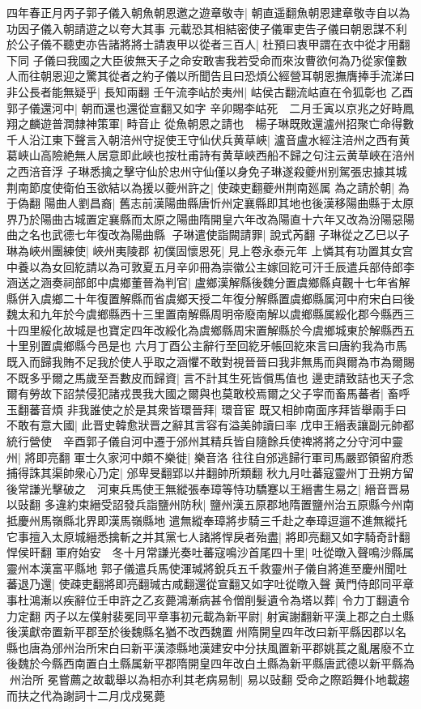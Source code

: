 四年春正月丙子郭子儀入朝魚朝恩邀之遊章敬寺|{
	朝直遥翻魚朝恩建章敬寺自以為功因子儀入朝請遊之以夸大其事}
元載恐其相結密使子儀軍吏告子儀曰朝恩謀不利於公子儀不聽吏亦告諸將將士請衷甲以從者三百人|{
	杜預曰衷甲謂在衣中從才用翻下同}
子儀曰我國之大臣彼無天子之命安敢害我若受命而來汝曹欲何為乃從家僮數人而往朝恩迎之驚其從者之約子儀以所聞告且曰恐煩公經營耳朝恩撫膺捧手流涕曰非公長者能無疑乎|{
	長知兩翻}
壬午流李岾於夷州|{
	岵侯古翻流岵直在令狐彰也}
乙酉郭子儀還河中|{
	朝而還也還從宣翻又如字}
辛卯賜李岵死　二月壬寅以京兆之好畤鳳翔之麟遊普潤隸神策軍|{
	畤音止}
從魚朝恩之請也　楊子琳既敗還瀘州招聚亡命得數千人沿江東下聲言入朝涪州守捉使王守仙伏兵黄草峽|{
	瀘音盧水經注涪州之西有黄葛峽山高險絶無人居意即此峽也按杜甫詩有黄草峽西船不歸之句注云黄草峽在涪州之西涪音浮}
子琳悉擒之擊守仙於忠州守仙僅以身免子琳遂殺夔州别駕張忠據其城荆南節度使衛伯玉欲結以為援以夔州許之|{
	使疎吏翻夔州荆南廵属}
為之請於朝|{
	為于偽翻}
陽曲人劉昌裔|{
	舊志前漢陽曲縣唐忻州定襄縣即其地也後漢移陽曲縣于太原界乃於陽曲古城置定襄縣而太原之陽曲隋開皇六年改為陽直十六年又改為汾陽惡陽曲之名也武德七年復改為陽曲縣}
子琳遣使詣闕請罪|{
	說式芮翻}
子琳從之乙巳以子琳為峽州團練使|{
	峽州夷陵郡}
初僕固懷恩死|{
	見上卷永泰元年}
上憐其有功置其女宫中養以為女回紇請以為可敦夏五月辛卯冊為崇徽公主嫁回紇可汗壬辰遣兵部侍郎李涵送之涵奏祠部郎中虞鄉董晉為判官|{
	盧鄉漢解縣後魏分置虞鄉縣貞觀十七年省解縣併入虞鄉二十年復置解縣而省虞鄉天授二年復分解縣置虞鄉縣属河中府宋白曰後魏太和九年於今虞鄉縣西十三里置南解縣周明帝廢南解以虞鄉縣属綏化郡今縣西三十四里綏化故城是也寶定四年改綏化為虞鄉縣周宋置解縣於今虞鄉城東於解縣西五十里别置虞鄉縣今邑是也}
六月丁酉公主辭行至回紇牙帳回紇來言曰唐約我為市馬既入而歸我賄不足我於使人乎取之涵懼不敢對視晉晉曰我非無馬而與爾為市為爾賜不既多乎爾之馬歲至吾數皮而歸資|{
	言不計其生死皆償馬值也}
邊吏請致詰也天子念爾有勞故下詔禁侵犯諸戎畏我大國之爾與也莫敢校焉爾之父子寜而畜馬蕃者|{
	畜呼玉翻蕃音煩}
非我誰使之於是其衆皆環晉拜|{
	環音宦}
既又相帥南面序拜皆舉兩手曰不敢有意大國|{
	此晋史韓愈狀晋之辭其言容有溢美帥讀曰率}
戊申王縉表讓副元帥都統行營使　辛酉郭子儀自河中遷于邠州其精兵皆自隨餘兵使禆將將之分守河中靈州|{
	將即亮翻}
軍士久家河中頗不樂徙|{
	樂音洛}
往往自邠逃歸行軍司馬嚴郢領留府悉捕得誅其渠帥衆心乃定|{
	邠卑旻翻郢以井翻帥所類翻}
秋九月吐蕃寇靈州丁丑朔方留後常謙光擊破之　河東兵馬使王無縱張奉璋等恃功驕蹇以王縉書生易之|{
	縉音晋易以䜴翻}
多違約束縉受詔發兵詣鹽州防秋|{
	鹽州漢五原郡地隋置鹽州治五原縣今州南抵慶州馬嶺縣北界即漢馬嶺縣地}
遣無縱奉璋將步騎三千赴之奉璋逗遛不進無縱托它事擅入太原城縉悉擒斬之并其黨七人諸將悍戾者殆盡|{
	將即亮翻又如字騎奇計翻悍侯旰翻}
軍府始安　冬十月常謙光奏吐蕃寇鳴沙首尾四十里|{
	吐從暾入聲鳴沙縣属靈州本漢富平縣地}
郭子儀遣兵馬使渾瑊將銳兵五千救靈州子儀自將進至慶州聞吐蕃退乃還|{
	使疎吏翻將即亮翻瑊古咸翻還從宣翻又如字吐從暾入聲}
黄門侍郎同平章事杜鴻漸以疾辭位壬申許之乙亥薨鴻漸病甚令僧削髮遺令為塔以葬|{
	令力丁翻遺令力定翻}
丙子以左僕射裴冕同平章事初元載為新平尉|{
	射寅謝翻新平漢上郡之白土縣後漢獻帝置新平郡至於後魏縣名猶不改西魏置州隋開皇四年改曰新平縣因郡以名縣也唐為邠州治所宋白曰新平漢漆縣地漢建安中分扶風置新平郡姚萇之亂屠廢不立後魏於今縣西南置白土縣属新平郡隋開皇四年改白土縣為新平縣唐武德以新平縣為州治所}
冕嘗薦之故載舉以為相亦利其老病易制|{
	易以䜴翻}
受命之際蹈舞仆地載趨而扶之代為謝詞十二月戊戍冕薨

